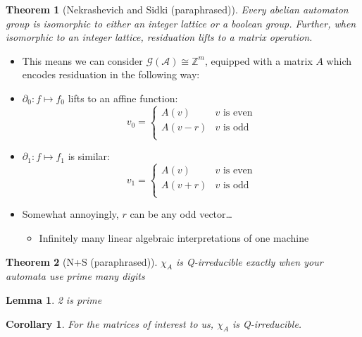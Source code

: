 \documentclass{beamer}
\newtheorem{thm}{Theorem}
\newtheorem{lem}{Lemma}
\newtheorem{cor}{Corollary}
\newcommand{\2}{\textbf{2}}
\newcommand{\A}{\mathcal{A}}
\newcommand{\G}{\mathcal{G}}
\newcommand{\Z}{\mathbb{Z}}
\begin{document}
\begin{frame}
  \begin{thm}[Nekrashevich and Sidki (paraphrased)]
    Every abelian automaton group is isomorphic to either an 
    integer lattice or a boolean group. 
    Further, when isomorphic to an integer lattice, residuation
    lifts to a matrix operation.
  \end{thm}

  \begin{itemize}
    \item This means we can consider $\G(\A) \cong \Z^m$, 
      equipped with a matrix $A$ which encodes residuation in the 
      following way:
    \item $\partial_0:f \mapsto f_0$ lifts to an affine function:
      \[
        v_0 = 
        \begin{cases}
          A(v)   & v \text{ is even}\\
          A(v-r) & v \text{ is odd}\\
        \end{cases}
      \]
    \item $\partial_1:f \mapsto f_1$ is similar:
      \[
        v_1 = 
        \begin{cases}
          A(v)   & v \text{ is even}\\
          A(v+r) & v \text{ is odd}\\
        \end{cases}
      \]
    \item Somewhat annoyingly, $r$ can be any odd vector\ldots
      \begin{itemize}
        \item Infinitely many linear algebraic interpretations of one machine
      \end{itemize}
  \end{itemize}
\end{frame}

\begin{frame}
  \begin{thm}[N+S (paraphrased)]
    $\chi_A$ is Q-irreducible exactly when your automata use prime many digits
  \end{thm}

  \begin{lem}
    2 is prime
  \end{lem}

  \begin{cor}
    For the matrices of interest to us, $\chi_A$ is Q-irreducible.
  \end{cor}
\end{frame}
\end{document}
